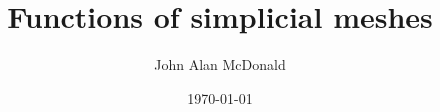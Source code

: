 \documentclass[11pt,fleqn]{article}
\begin{document}


\pagestyle{myheadings}

\title{Functions of simplicial meshes}
\author{ \sc John Alan McDonald }

\date{\today}

\maketitle







\appendix







\end{document}

